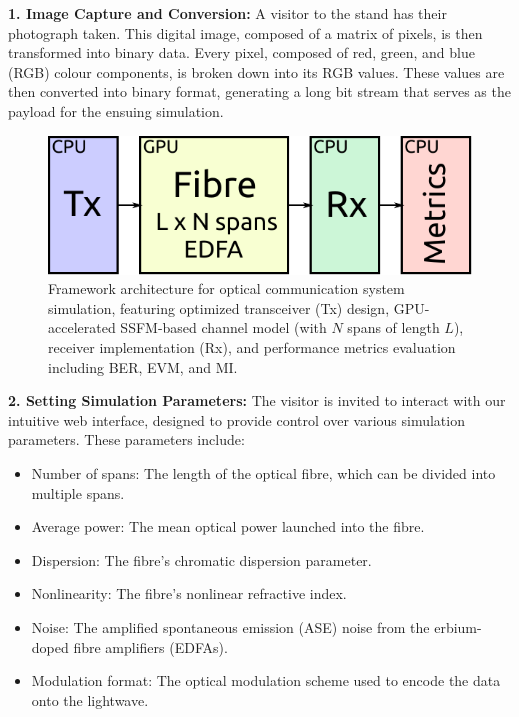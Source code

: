 \textbf{1. Image Capture and Conversion:} A visitor to the stand has their photograph taken. This digital image, composed of a matrix of pixels, is then transformed into binary data. Every pixel, composed of red, green, and blue (RGB) colour components, is broken down into its RGB values. These values are then converted into binary format, generating a long bit stream that serves as the payload for the ensuing simulation.


\begin{figure}[t]
   \centering
        \includegraphics[width=0.7\linewidth]{images/hpcom/hpcom_scheme.pdf}
    \caption{Framework architecture for optical communication system simulation, featuring optimized transceiver (Tx) design, GPU-accelerated SSFM-based channel model (with $N$ spans of length $L$), receiver implementation (Rx), and performance metrics evaluation including BER, EVM, and MI.}
    \label{fig:HpCom_scheme}
\end{figure}

\textbf{2. Setting Simulation Parameters:} The visitor is invited to interact with our intuitive web interface, designed to provide control over various simulation parameters. These parameters include:
\begin{itemize}
    \item Number of spans: The length of the optical fibre, which can be divided into multiple spans.
    \item Average power: The mean optical power launched into the fibre.
    \item Dispersion: The fibre's chromatic dispersion parameter.
    \item Nonlinearity: The fibre's nonlinear refractive index.
    \item Noise: The amplified spontaneous emission (ASE) noise from the erbium-doped fibre amplifiers (EDFAs).
    \item Modulation format: The optical modulation scheme used to encode the data onto the lightwave.
\end{itemize}

